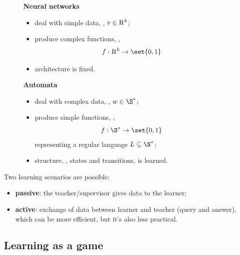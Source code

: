 \documentclass[oneside]{academica}
\begin{document}
\begin{figure}[H]
  \begin{minipage}[t]{0.45\textwidth}
    \begin{center}
      \textbf{Neural networks}
    \end{center}
    \begin{itemize}
      \item deal with simple data, \eg, $v \in \mathrm{R}^k$;
      \item produce complex functions, \eg,
        \begin{equation*}
          f: \RRR^k \to \set{0,1}
        \end{equation*}
      \item architecture is fixed.
    \end{itemize}
  \end{minipage}
  \begin{minipage}[t]{0.5\textwidth}
    \begin{center}
      \textbf{Automata}
    \end{center}
    \begin{itemize}
      \item deal with complex data, \eg, $w \in \S^*$;
      \item produce simple functions, \eg, 
        \begin{equation*}
          f: \S^* \to \set{0,1}
        \end{equation*}
        representing a regular language $L \subseteq \S^*$;
      \item structure, \ie, states and transitions, is learned.
    \end{itemize}
  \end{minipage}
\end{figure}

Two learning scenarios are possible:
\begin{itemize}
  \item \textbf{passive}: the teacher/supervisor gives data to the learner;
  \item \textbf{active}: exchange of data between learner and teacher (query and answer), which can be more efficient, but it's also less practical.
\end{itemize}

\subsection{Learning as a game}
\end{document}
